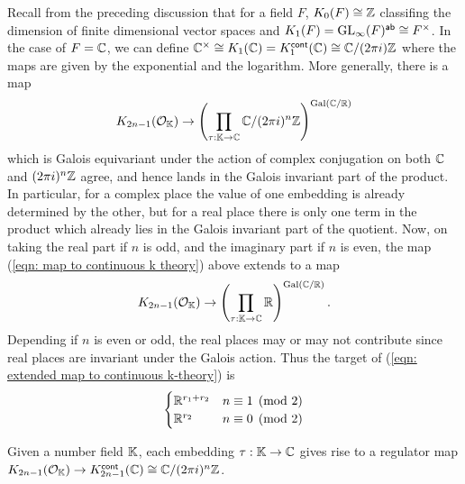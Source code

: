 Recall from the preceding discussion that for a field $F$, $K_{0}(F)\cong\mathbb{Z}$ classifing the dimension of finite dimensional vector spaces and $K_{1}(F)=\mathrm{GL}_{\infty}(F)^{\mathsf{ab}}\cong F^{\times}$. In the case of $F=\mathbb{C}$, we can define $\mathbb{C}^{\times}\cong K_{1}(\mathbb{C})=K_{1}^{\mathsf{cont}}(\mathbb{C})\cong\mathbb{C}/(2\pi i)\mathbb{Z}$ where the maps are given by the exponential and the logarithm. More generally, there is a map 
\begin{equation}\label{eqn: map to continuous k theory}
    K_{2n-1}(\mathcal{O}_{\mathbb{K}})\to\left(\prod_{\tau:\mathbb{K}\to\mathbb{C}}\mathbb{C}/(2\pi i)^{n}\mathbb{Z}\right)^{\mathrm{Gal}(\mathbb{C}/\mathbb{R})}
\end{equation}
which is Galois equivariant under the action of complex conjugation on both $\mathbb{C}$ and $(2\pi i)^{n}\mathbb{Z}$ agree, and hence lands in the Galois invariant part of the product. In particular, for a complex place the value of one embedding is already determined by the other, but for a real place there is only one term in the product which already lies in the Galois invariant part of the quotient. Now, on taking the real part if $n$ is odd, and the imaginary part if $n$ is even, the map (\ref{eqn: map to continuous k theory}) above extends to a map 
\begin{equation}\label{eqn: extended map to continuous k-theory}
    K_{2n-1}(\mathcal{O}_{\mathbb{K}})\to\left(\prod_{\tau:\mathbb{K}\to\mathbb{C}}\mathbb{R}\right)^{\mathrm{Gal}(\mathbb{C}/\mathbb{R})}.
\end{equation}
Depending if $n$ is even or odd, the real places may or may not contribute since real places are invariant under the Galois action. Thus the target of (\ref{eqn: extended map to continuous k-theory}) is 
$$\begin{cases}
    \mathbb{R}^{r_{1}+r_{2}} & n\equiv1\pmod{2} \\
    \mathbb{R}^{r_{2}} & n\equiv0\pmod{2}
\end{cases}$$


Given a number field $\mathbb{K}$, each embedding $\tau:\mathbb{K}\to\mathbb{C}$ gives rise to a regulator map $K_{2n-1}(\mathcal{O}_{\mathbb{K}})\to K^{\mathsf{cont}}_{2n-1}(\mathbb{C})\cong\mathbb{C}/(2\pi i)^{n}\mathbb{Z}$. 
